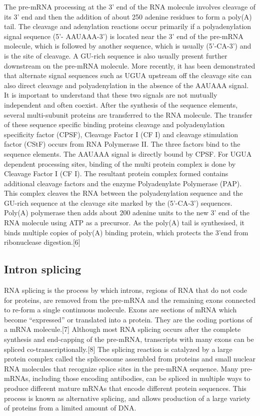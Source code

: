 The pre-mRNA processing at the 3' end of the RNA molecule involves cleavage of its 3' end and then the addition of about 250 adenine residues to form a poly(A) tail. The cleavage and adenylation reactions occur primarily if a polyadenylation signal sequence (5'- AAUAAA-3') is located near the 3' end of the pre-mRNA molecule, which is followed by another sequence, which is usually (5'-CA-3') and is the site of cleavage. A GU-rich sequence is also usually present further downstream on the pre-mRNA molecule. More recently, it has been demonstrated that alternate signal sequences such as UGUA upstream off the cleavage site can also direct cleavage and polyadenylation in the absence of the AAUAAA signal. It is important to understand that these two signals are not mutually independent and often coexist. After the synthesis of the sequence elements, several multi-subunit proteins are transferred to the RNA molecule. The transfer of these sequence specific binding proteins cleavage and polyadenylation specificity factor (CPSF), Cleavage Factor I (CF I) and cleavage stimulation factor (CStF) occurs from RNA Polymerase II. The three factors bind to the sequence elements. The AAUAAA signal is directly bound by CPSF. For UGUA dependent processing sites, binding of the multi protein complex is done by Cleavage Factor I (CF I). The resultant protein complex formed contains additional cleavage factors and the enzyme Polyadenylate Polymerase (PAP). This complex cleaves the RNA between the polyadenylation sequence and the GU-rich sequence at the cleavage site marked by the (5'-CA-3') sequences. Poly(A) polymerase then adds about 200 adenine units to the new 3' end of the RNA molecule using ATP as a precursor. As the poly(A) tail is synthesised, it binds multiple copies of poly(A) binding protein, which protects the 3'end from ribonuclease digestion.{[}6{]}

\hypertarget{intron-splicing}{%
\subsection{Intron splicing}\label{intron-splicing}}

RNA splicing is the process by which introns, regions of RNA that do not code for proteins, are removed from the pre-mRNA and the remaining exons connected to re-form a single continuous molecule. Exons are sections of mRNA which become ``expressed'' or translated into a protein. They are the coding portions of a mRNA molecule.{[}7{]} Although most RNA splicing occurs after the complete synthesis and end-capping of the pre-mRNA, transcripts with many exons can be spliced co-transcriptionally.{[}8{]} The splicing reaction is catalyzed by a large protein complex called the spliceosome assembled from proteins and small nuclear RNA molecules that recognize splice sites in the pre-mRNA sequence. Many pre-mRNAs, including those encoding antibodies, can be spliced in multiple ways to produce different mature mRNAs that encode different protein sequences. This process is known as alternative splicing, and allows production of a large variety of proteins from a limited amount of DNA.

